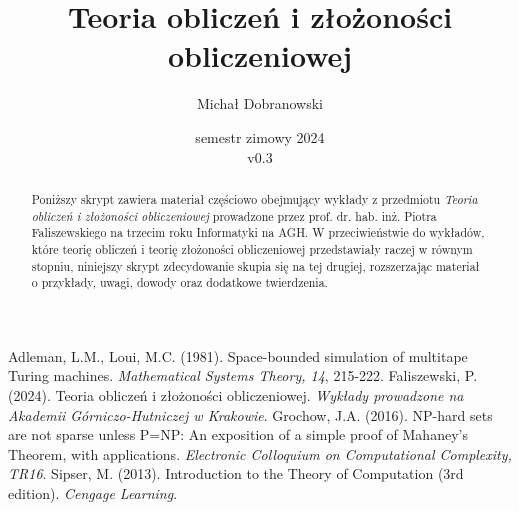 \documentclass[pretty,polish,bibliography=totocnumbered]{angav}
\title{Teoria obliczeń i złożoności obliczeniowej}
\author{Michał Dobranowski}
\date{semestr zimowy 2024 \\ v0.3}
\begin{document}
    \maketitle
    \begin{abstract}
        \noindent Poniższy skrypt zawiera materiał częściowo obejmujący wykłady z przedmiotu \textit{Teoria obliczeń i złożoności obliczeniowej} prowadzone przez prof. dr. hab. inż. Piotra Faliszewskiego na trzecim roku Informatyki na AGH. W przeciwieństwie do wykładów, które teorię obliczeń i teorię złożoności obliczeniowej przedstawiały raczej w równym stopniu, niniejszy skrypt zdecydowanie skupia się na tej drugiej, rozszerzając materiał o przykłady, uwagi, dowody oraz dodatkowe twierdzenia.
    \end{abstract}
    \vspace*{\fill}
    {\footnotesize\doclicenseThis}
    \newpage

    \tableofcontents
    \newpage

    \SetVertexStyle[FillColor=gray, FillOpacity=0.4]
    \SetEdgeStyle[Color=black, LineWidth=0.8pt]

    
    

    \begin{thebibliography}{9}
         Adleman, L.M., Loui, M.C. (1981). Space-bounded simulation of multitape Turing machines. \textit{Mathematical Systems Theory, 14}, 215-222.
         Faliszewski, P. (2024). Teoria obliczeń i złożoności obliczeniowej. \textit{Wykłady prowadzone na Akademii Górniczo-Hutniczej w Krakowie}.
         Grochow, J.A. (2016). NP-hard sets are not sparse unless P=NP: An exposition of a simple proof of Mahaney's Theorem, with applications. \textit{Electronic Colloquium on Computational Complexity, TR16}.
         Sipser, M. (2013). Introduction to the Theory of Computation (3rd edition). \textit{Cengage Learning}.
    \end{thebibliography}
\end{document}
